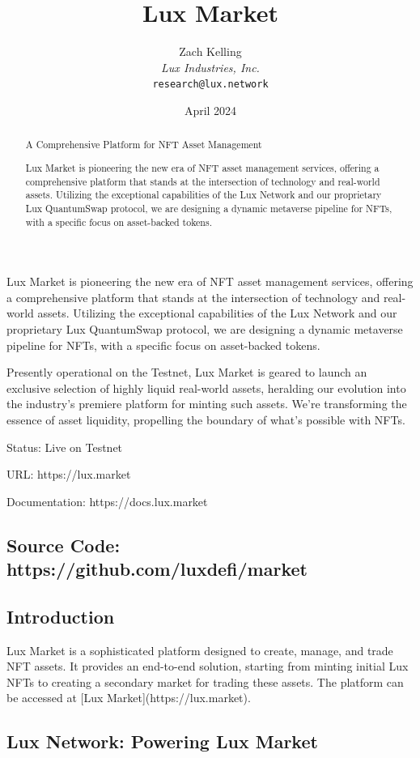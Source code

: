 \documentclass[11pt]{article}
\title{Lux Market}
\author{Zach Kelling\\\textit{Lux Industries, Inc.}\\\texttt{research@lux.network}}
\date{April 2024}
\begin{document}
\luxcoverpage

\begin{abstract}
A Comprehensive Platform for NFT Asset Management

Lux Market is pioneering the new era of NFT asset management services, offering a comprehensive platform that stands at the intersection of technology and real-world assets. Utilizing the exceptional capabilities of the Lux Network and our proprietary Lux QuantumSwap protocol, we are designing a dynamic metaverse pipeline for NFTs, with a specific focus on asset-backed tokens.
\end{abstract}

\tableofcontents
\newpage


Lux Market is pioneering the new era of NFT asset management services, offering a comprehensive platform that stands at the intersection of technology and real-world assets. Utilizing the exceptional capabilities of the Lux Network and our proprietary Lux QuantumSwap protocol, we are designing a dynamic metaverse pipeline for NFTs, with a specific focus on asset-backed tokens.


Presently operational on the Testnet, Lux Market is geared to launch an exclusive selection of highly liquid real-world assets, heralding our evolution into the industry's premiere platform for minting such assets. We're transforming the essence of asset liquidity, propelling the boundary of what's possible with NFTs.


Status: Live on Testnet


URL: https://lux.market


Documentation: https://docs.lux.market


\subsection{Source Code: https://github.com/luxdefi/market}

\subsection{Introduction}

Lux Market is a sophisticated platform designed to create, manage, and trade NFT assets. It provides an end-to-end solution, starting from minting initial Lux NFTs to creating a secondary market for trading these assets. The platform can be accessed at [Lux Market](https://lux.market).


\subsection{Lux Network: Powering Lux Market}
\end{document}
